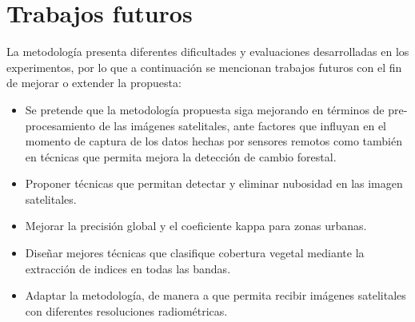 \section{Trabajos futuros}
La metodolog\'ia presenta diferentes dificultades y evaluaciones desarrolladas en los experimentos, por lo que a continuaci\'on se mencionan trabajos futuros con el fin de mejorar o extender la propuesta:
\begin{itemize}
\item Se pretende que la metodolog\'ia propuesta siga mejorando en t\'erminos de pre-procesamiento de las im\'agenes satelitales, ante factores que influyan en el momento de captura de los datos hechas por sensores remotos como tambi\'en en t\'ecnicas que permita mejora la detecci\'on de cambio forestal.
\item Proponer t\'ecnicas que permitan detectar y eliminar nubosidad en las imagen satelitales.
\item Mejorar la precisi\'on global y el coeficiente kappa para zonas urbanas.
\item Dise\~{n}ar mejores t\'ecnicas que clasifique cobertura vegetal mediante la extracci\'on de indices en todas las bandas.
\item Adaptar la metodolog\'ia, de manera a que permita recibir im\'agenes satelitales con diferentes resoluciones radiom\'etricas.


\end{itemize}
